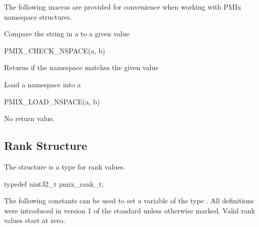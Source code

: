 The following macros are provided for convenience when working with \ac{PMIx} namespace structures.


Compare the string in a  to a given value

\cspecificstart
\begin{codepar}
PMIX_CHECK_NSPACE(a, b)
\end{codepar}
\cspecificend

\begin{arglist}
\end{arglist}

Returns  if the namespace matches the given value


Load a namespace into a 

\cspecificstart
\begin{codepar}
PMIX_LOAD_NSPACE(a, b)
\end{codepar}
\cspecificend

\begin{arglist}
\end{arglist}

No return value.


\subsection{Rank Structure}

The  structure is a  type for rank values.

\cspecificstart
\begin{codepar}
typedef uint32_t pmix_rank_t;
\end{codepar}
\cspecificend

The following constants can be used to set a variable of the type . All definitions were introduced in version 1 of the standard unless otherwise marked. Valid rank values start at zero.

